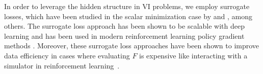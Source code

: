 \documentclass{article} %
\theoremstyle{definition}
\begin{document}
In order to leverage the hidden structure in VI problems, we employ surrogate losses, which have been studied in the scalar minimization case by \citet{pmlr-v119-johnson20b} and \citet{vaswani2021general}, among others.
The surrogate loss approach has been shown to be scalable with deep learning and has been used in modern reinforcement learning policy gradient methods \citep{schulman2015trust,schulman2017proximal,abdolmaleki2018maximum}.
Moreover, these surrogate loss approaches have been shown to improve data efficiency in cases where evaluating $F$ is expensive like interacting with a simulator in reinforcement learning~\citep{vaswani2021general,lavington2023target}.
\end{document}
